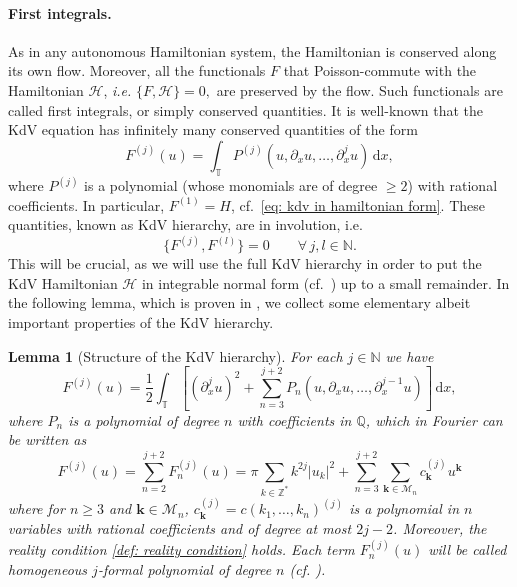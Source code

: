 \documentclass[a4paper,10pt,reqno]{article}
\theoremstyle{definition}
\theoremstyle{plain}
\theoremstyle{plain}
\theoremstyle{definition}
\theoremstyle{plain}
\theoremstyle{plain}
\theoremstyle{plain}
\newtheorem{lemma}[definition]{Lemma}
\theoremstyle{definition}
\theoremstyle{definition}
\def \N{\mathbb N}
\def \Z{\mathbb Z}
\def \Q{\mathbb Q}
\def \pa{{\partial}}
\def \T{\mathbb{T}}
\def \H{\mathcal{H}}
\def \M{\mathcal{M}}
\def \k{\bm{k}}
\begin{document}
\paragraph{First integrals.}
As in any autonomous Hamiltonian system, the Hamiltonian is conserved along its own flow.
Moreover, all the functionals $F$ that Poisson-commute with the Hamiltonian $\H$, \textit{i.e.} $\{ F, \H \} = 0,$ are preserved by the flow.
Such functionals are called first integrals, or simply conserved quantities. 
It is well-known \cite{lax, magri, gardner, miura} that the KdV equation has infinitely many conserved quantities of the form
\begin{equation} \label{eq: pre first integrals}
F^{(j)}(u) 
=\int_{\T} P^{(j)}(u,\pa_x u,\ldots,\pa_x^{j} u) \, \mathrm{d} x,
\end{equation}
where $P^{(j)}$ is a polynomial (whose monomials are of degree $\ge 2$) with rational coefficients. In particular, $F^{(1)}=H$, cf.~\eqref{eq: kdv in hamiltonian form}.
These quantities, known as KdV hierarchy, are in involution, i.e.
\begin{equation}
\{ F^{(j)} , F^{(l)} \} = 0 \qquad \forall \, j,l \in \N.
\label{eq: first integral in involution}
\end{equation}
This will be crucial, as we will use the full KdV hierarchy in order to put the KdV Hamiltonian $\H$ in integrable normal form (cf.~) up to a small remainder.
In the following lemma, which is proven in , we collect some elementary albeit important properties of the KdV hierarchy.

\begin{lemma}[Structure of the KdV hierarchy] \label{lem:first_integrals} 
For each $j \in \N$ we have 
\begin{equation}
F^{(j)}(u) = \frac{1}{2} \int_{\T} \left [ \left ( \pa_x^j u \right )^2 + \sum_{n=3}^{j+2} P_n(u,\pa_x u,\ldots,\pa_x^{j-1} u) \right ] \, \mathrm{d}x,
\label{eq: first integrals}
\end{equation}
where $P_n$ is a polynomial of degree $n$ with coefficients in $\Q$, which in Fourier can be written as
\begin{equation}
F^{(j)}(u) = \sum_{n=2}^{j+2} F^{(j)}_n(u) = \pi \sum_{k \in \Z^*} k^{2j} |u_k|^2 + \sum_{n=3}^{j+2} \sum_{\k \in \M_n} c_{\k}^{(j)} u^{\k}
\label{eq: first integrals in fourier}
\end{equation}
where for $n \ge 3$ and $\k \in \M_n$, $c_{\k}^{(j)} = c(k_1,\ldots,k_n)^{(j)}$ is a polynomial in $n$ variables with rational coefficients and of degree at most $2j-2$.
Moreover, the reality condition \eqref{def: reality condition} holds. Each term $F^{(j)}_n(u)$ will be called homogeneous $j$-formal polynomial of degree $n$ (cf. ).
\end{lemma}
\end{document}

